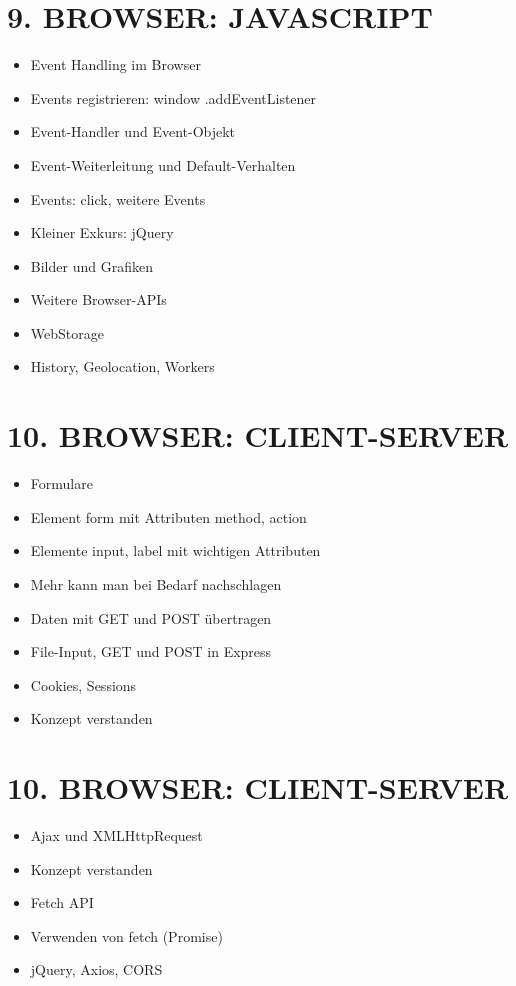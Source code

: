 \documentclass[10pt]{article}
\begin{document}
\section*{9. BROWSER: JAVASCRIPT}
\begin{itemize}
  \item Event Handling im Browser
  \item Events registrieren: window .addEventListener
  \item Event-Handler und Event-Objekt
  \item Event-Weiterleitung und Default-Verhalten
  \item Events: click, weitere Events
  \item Kleiner Exkurs: jQuery
  \item Bilder und Grafiken
  \item Weitere Browser-APIs
  \item WebStorage
  \item History, Geolocation, Workers
\end{itemize}

\section*{10. BROWSER: CLIENT-SERVER}
\begin{itemize}
  \item Formulare
  \item Element form mit Attributen method, action
  \item Elemente input, label mit wichtigen Attributen
  \item Mehr kann man bei Bedarf nachschlagen
  \item Daten mit GET und POST übertragen
  \item File-Input, GET und POST in Express
  \item Cookies, Sessions
  \item Konzept verstanden
\end{itemize}

\section*{10. BROWSER: CLIENT-SERVER}
\begin{itemize}
  \item Ajax und XMLHttpRequest
  \item Konzept verstanden
  \item Fetch API
  \item Verwenden von fetch (Promise)
  \item jQuery, Axios, CORS
\end{itemize}
\end{document}
